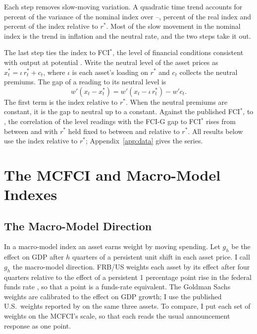 \documentclass[11pt]{article}
\newcommand{\rs}{r^{*}}
\begin{document}
Each step removes slow-moving variation. A quadratic time trend accounts for  percent of the variance of the nominal index over --,  percent of the real index and  percent of the index relative to $\rs$. Most of the slow movement in the nominal index is the trend in inflation and the neutral rate, and the two steps take it out.

The last step ties the index to FCI$^*$, the level of financial conditions consistent with output at potential \citep{caballero2026}. Write the neutral level of the asset prices as $x^*_t=\iota\,\rs_t+c_t$, where $\iota$ is each asset's loading on $\rs$ and $c_t$ collects the neutral premiums. The gap of a reading to its neutral level is
\begin{equation}\label{eq:gap}
w'(x_t-x^*_t)=w'(x_t-\iota\,\rs_t)-w'c_t .
\end{equation}
The first term is the index relative to $\rs$. When the neutral premiums are constant, it is the gap to neutral up to a constant. Against the published FCI$^*$,  to , the correlation of the level readings with the FCI-G gap to FCI$^*$ rises from between  and  with $\rs$ held fixed to between  and  relative to $\rs$. All results below use the index relative to $\rs$; Appendix~\ref{app:data} gives the series.

\section{The MCFCI and Macro-Model Indexes}\label{sec:macro}
\subsection{The Macro-Model Direction}\label{sec:spending}
In a macro-model index an asset earns weight by moving spending. Let $g_h$ be the effect on GDP after $h$ quarters of a persistent unit shift in each asset price. I call $g_h$ the macro-model direction. FRB/US weights each asset by its effect after four quarters relative to the effect of a persistent 1 percentage point rise in the federal funds rate \citep{brayton2014}, so that a point is a funds-rate equivalent. The Goldman Sachs weights are calibrated to the effect on GDP growth; I use the published U.S.\ weights reported by \citet{caballero2026b} on the same three assets. To compare, I put each set of weights on the MCFCI's scale, so that each reads the usual announcement response as one point.
\end{document}
